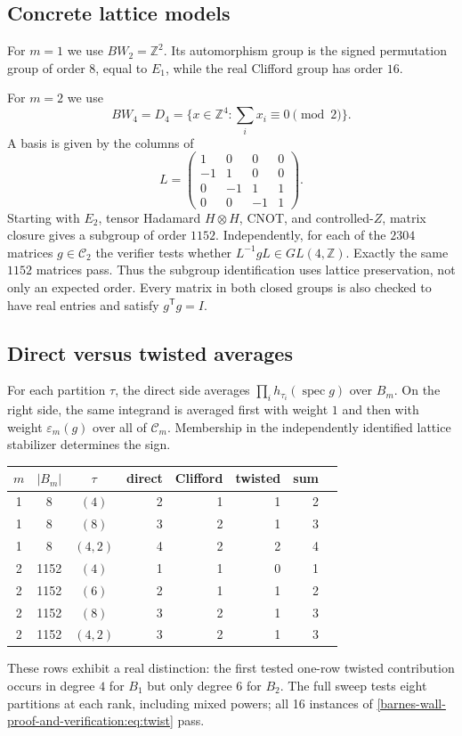 \documentclass[10pt]{article}
\begin{document}
\subsection{Concrete lattice models}
For $m=1$ we use $BW_2=\mathbb Z^2$.  Its automorphism group is the signed
permutation group of order $8$, equal to $E_1$, while the real Clifford group
has order $16$.

For $m=2$ we use
\[
 BW_4=D_4=\{x\in\mathbb Z^4:\textstyle\sum_i x_i\equiv0\pmod2\}.
\]
A basis is given by the columns of
\[
L=\begin{pmatrix}
1&0&0&0\\-1&1&0&0\\0&-1&1&1\\0&0&-1&1
\end{pmatrix}.
\]
Starting with $E_2$, tensor Hadamard $H\otimes H$, CNOT, and controlled-$Z$,
matrix closure gives a subgroup of order $1152$.  Independently, for each of
the $2304$ matrices $g\in\mathcal C_2$ the verifier tests whether
$L^{-1}gL\in GL(4,\mathbb Z)$.  Exactly the same $1152$ matrices pass.  Thus
the subgroup identification uses lattice preservation, not only an expected
order.  Every matrix in both closed groups is also checked to have real
entries and satisfy $g^{\mathsf T}g=I$.

\subsection{Direct versus twisted averages}
For each partition $\tau$, the direct side averages
$\prod_i h_{\tau_i}(\operatorname{spec}g)$ over $B_m$.  On the right side,
the same integrand is averaged first with weight $1$ and then with weight
$\varepsilon_m(g)$ over all of $\mathcal C_m$.  Membership in the independently
identified lattice stabilizer determines the sign.

\begin{center}
\begin{tabular}{@{}cccrrrrr@{}}\toprule
$m$&$|B_m|$&$\tau$&direct&Clifford&twisted&sum\\\midrule
1&8&$(4)$&2&1&1&2\\
1&8&$(8)$&3&2&1&3\\
1&8&$(4,2)$&4&2&2&4\\
2&1152&$(4)$&1&1&0&1\\
2&1152&$(6)$&2&1&1&2\\
2&1152&$(8)$&3&2&1&3\\
2&1152&$(4,2)$&3&2&1&3\\\bottomrule
\end{tabular}
\end{center}
These rows exhibit a real distinction: the first tested one-row twisted
contribution occurs in degree $4$ for $B_1$ but only degree $6$ for $B_2$.
The full sweep tests eight partitions at each rank, including mixed powers;
all 16 instances of \eqref{barnes-wall-proof-and-verification:eq:twist} pass.
\end{document}
